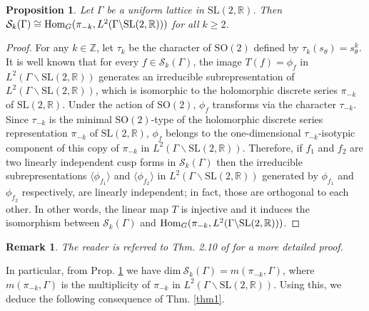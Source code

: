 \documentclass[11 pt]{amsart}
\newcommand{\R}{{\mathbb R}}
\newcommand{\Z}{{\mathbb Z}}
\newcommand{\N}{{\mathbb N}}
\newcommand{\Hom}{{\rm Hom}}
\newtheorem{proposition}[theorem]{Proposition}
\theoremstyle{definition}
\newtheorem{remark}{Remark}[section]
\numberwithin{equation}{section}
\begin{document}
\begin{proposition}\label{prop-dic}
\textit{Let $\Gamma$ be a uniform lattice in $\mathrm{SL}(2, \R)$. Then $\mathcal{S}_k(\Gamma) \cong \Hom_G(\pi_{-k} , L^2(\Gamma \backslash \mathrm{SL}(2, \R) ))$ for all $k \geq 2$.}
\end{proposition}
\begin{proof}
For any $k \in \Z$, let $\tau_k$ be the character of $\mathrm{SO}(2)$ defined by $\tau_k(s_{\theta})=s_{\theta}^k$. It is well known that for every $f \in \mathcal{S}_k(\Gamma)$, the image $T(f)=\phi_f$ in $L^2(\Gamma \backslash \mathrm{SL}(2, \R))$ generates an irreducible subrepresentation of $L^2(\Gamma \backslash \mathrm{SL}(2, \R))$, which is isomorphic to the holomorphic discrete series $\pi_{-k}$ of $\mathrm{SL}(2, \R)$. Under the action of $\mathrm{SO}(2)$, $\phi_f$ transforms via the character $\tau_{-k}$. Since $\tau_{-k}$ is the minimal $\mathrm{SO}(2)$-type of the holomorphic discrete series representation $\pi_{-k}$ of $\mathrm{SL}(2, \R)$, $\phi_f$ belongs to the one-dimensional $\tau_{-k}$-isotypic component of this copy of $\pi_{-k}$ in $L^2(\Gamma \backslash \mathrm{SL}(2, \R))$. Therefore, if $f_1$ and $f_2$ are two linearly independent cusp forms in $\mathcal{S}_k(\Gamma)$ then the irreducible subrepresentations $\langle \phi_{f_1} \rangle$ and $\langle \phi_{f_2} \rangle$ in $L^2(\Gamma \backslash \mathrm{SL}(2, \R))$ generated by $\phi_{f_1}$ and $\phi_{f_2}$ respectively, are linearly independent; in fact, those are orthogonal to each other. In other words, the linear map $T$ is injective and it induces the isomorphism between $\mathcal{S}_k(\Gamma)$ and $\Hom_G(\pi_{-k} , L^2(\Gamma \backslash \mathrm{SL}(2, \R) ))$.     
\end{proof}

\begin{remark}
   \textit{The reader is referred to Thm. 2.10 of \cite{SG} for a more detailed proof.}
\end{remark}

\noindent In particular, from Prop. \ref{prop-dic} we have $\text{dim}\ \mathcal{S}_k(\Gamma) = m(\pi_{-k} , \Gamma)$, where $m(\pi_{-k} , \Gamma)$ is the multiplicity of $\pi_{-k}$ in $  L^2(\Gamma \backslash \mathrm{SL}(2, \R))$. Using this, we deduce the following consequence of Thm. \ref{thm1}. 
\end{document}

